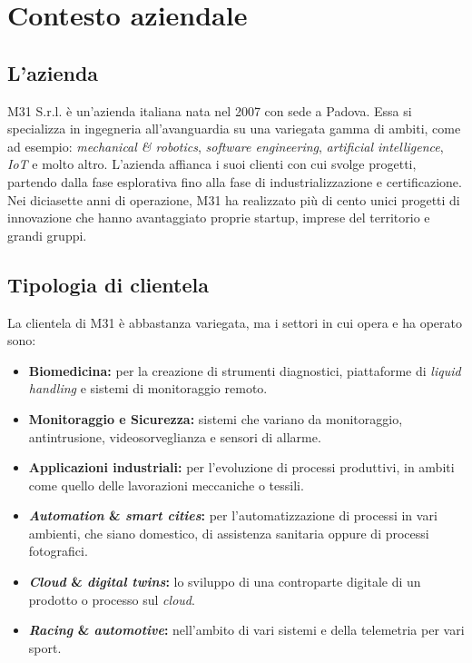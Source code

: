 \chapter{Contesto aziendale}
\label{chap:contesto-aziendale}

\section{L'azienda}\label{sec:the-company}\noindent
M31 S.r.l. è un'azienda italiana nata nel 2007 con sede a Padova.
Essa si specializza in ingegneria all'avanguardia su una variegata gamma di ambiti, come ad esempio: \textit{mechanical \& robotics}, \textit{software engineering}, \textit{artificial intelligence}, \textit{IoT} e molto altro.
L'azienda affianca i suoi clienti con cui svolge progetti, partendo dalla fase esplorativa fino alla fase di industrializzazione e certificazione.
Nei diciasette anni di operazione, M31 ha realizzato più di cento unici progetti di innovazione che hanno avantaggiato proprie startup, imprese del territorio e grandi gruppi.

\section{Tipologia di clientela}\noindent
La clientela di M31 è abbastanza variegata, ma i settori in cui opera e ha operato sono:
\begin{itemize}
    \item \textbf{Biomedicina:} per la creazione di strumenti diagnostici, piattaforme di \textit{liquid handling} e sistemi di monitoraggio remoto.
    \item \textbf{Monitoraggio e Sicurezza:} sistemi che variano da monitoraggio, antintrusione, videosorveglianza e sensori di allarme.
    \item \textbf{Applicazioni industriali:} per l'evoluzione di processi produttivi, in ambiti come quello delle lavorazioni meccaniche o tessili.
    \item \textbf{\textit{Automation} \& \textit{smart cities}:} per l'automatizzazione di processi in vari ambienti, che siano domestico, di assistenza sanitaria oppure di processi fotografici.
    \item \textbf{\textit{Cloud} \& \textit{digital twins}:} lo sviluppo di una controparte digitale di un prodotto o processo sul \textit{cloud}.
    \item \textbf{\textit{Racing} \& \textit{automotive}:} nell'ambito di vari sistemi e della telemetria per vari sport.
\end{itemize}

